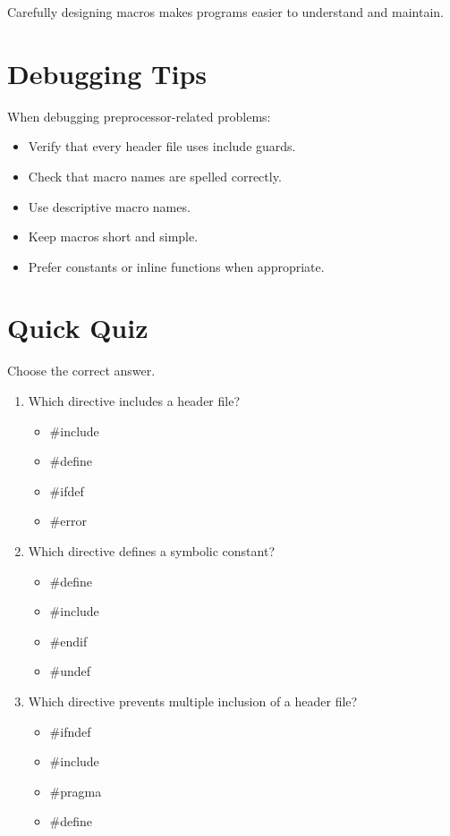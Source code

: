 \documentclass[12pt,openany]{book}
\begin{document}
Carefully designing macros makes programs easier to understand and maintain.

\section{Debugging Tips}

When debugging preprocessor-related problems:

\begin{itemize}
    \item Verify that every header file uses include guards.
    \item Check that macro names are spelled correctly.
    \item Use descriptive macro names.
    \item Keep macros short and simple.
    \item Prefer constants or inline functions when appropriate.
\end{itemize}

\section{Quick Quiz}

Choose the correct answer.

\begin{enumerate}
    \item Which directive includes a header file?
    \begin{itemize}
        \item \#include
        \item \#define
        \item \#ifdef
        \item \#error
    \end{itemize}

    \item Which directive defines a symbolic constant?
    \begin{itemize}
        \item \#define
        \item \#include
        \item \#endif
        \item \#undef
    \end{itemize}

    \item Which directive prevents multiple inclusion of a header file?
    \begin{itemize}
        \item \#ifndef
        \item \#include
        \item \#pragma
        \item \#define
    \end{itemize}
\end{enumerate}
\end{document}

